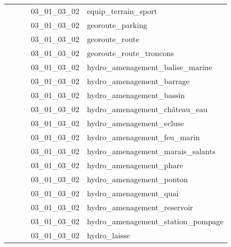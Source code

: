 \documentclass[12pt,titlepage]{book}
\begin{document}
\begin{supertabular}{|p{7.5cm}|p{7.5cm}|p{7.5cm}|c|p{10cm}|}
                   &                    &                    & 03\_01\_03\_02 & equip\_terrain\_sport\\
                   &                    &                    & 03\_01\_03\_02 & georoute\_parking\\
                   &                    &                    & 03\_01\_03\_02 & georoute\_route\\
                   &                    &                    & 03\_01\_03\_02 & georoute\_route\_troncons\\
                   &                    &                    & 03\_01\_03\_02 & hydro\_amenagement\_balise\_marine\\
                   &                    &                    & 03\_01\_03\_02 & hydro\_amenagement\_barrage\\
                   &                    &                    & 03\_01\_03\_02 & hydro\_amenagement\_bassin\\
                   &                    &                    & 03\_01\_03\_02 & hydro\_amenagement\_château\_eau\\
                   &                    &                    & 03\_01\_03\_02 & hydro\_amenagement\_ecluse\\
                   &                    &                    & 03\_01\_03\_02 & hydro\_amenagement\_feu\_marin\\
                   &                    &                    & 03\_01\_03\_02 & hydro\_amenagement\_marais\_salants\\
                   &                    &                    & 03\_01\_03\_02 & hydro\_amenagement\_phare\\
                   &                    &                    & 03\_01\_03\_02 & hydro\_amenagement\_ponton\\
                   &                    &                    & 03\_01\_03\_02 & hydro\_amenagement\_quai\\
                   &                    &                    & 03\_01\_03\_02 & hydro\_amenagement\_reservoir\\
                   &                    &                    & 03\_01\_03\_02 & hydro\_amenagement\_station\_pompage\\
                   &                    &                    & 03\_01\_03\_02 & hydro\_laisse\\

\end{supertabular}
\end{document}
